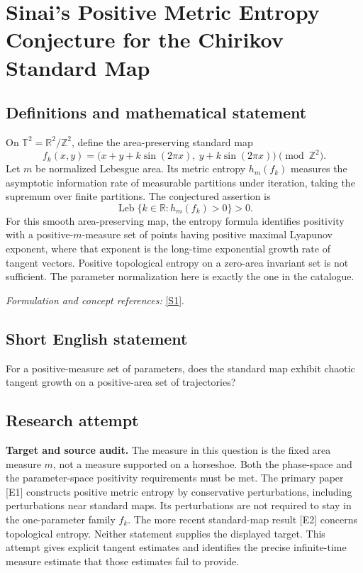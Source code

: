 \documentclass[11pt]{article}
\begin{document}
\section*{\texorpdfstring{Sinai's Positive Metric Entropy Conjecture for the Chirikov Standard Map}{Sinai's Positive Metric Entropy Conjecture for the Chirikov Standard Map}}\label{30006866}
\subsection{Definitions and mathematical statement}
On $\mathbb T^2={\mathbb{R}}^2/{\mathbb{Z}}^2$, define the area-preserving standard map
\[
 f_k(x,y)=\bigl(x+y+k\sin(2\pi x),\ y+k\sin(2\pi x)\bigr)\pmod{{\mathbb{Z}}^2}.
\]
Let $m$ be normalized Lebesgue area. Its metric entropy $h_m(f_k)$ measures the asymptotic information rate of measurable partitions under iteration, taking the supremum over finite partitions. The conjectured assertion is
\[
 \operatorname{Leb}\{k\in{\mathbb{R}}:h_m(f_k)>0\}>0.
\]
For this smooth area-preserving map, the entropy formula identifies positivity with a positive-$m$-measure set of points having positive maximal Lyapunov exponent, where that exponent is the long-time exponential growth rate of tangent vectors. Positive topological entropy on a zero-area invariant set is not sufficient. The parameter normalization here is exactly the one in the catalogue.
\par\smallskip\textit{Formulation and concept references:} \href{https://www.math.uci.edu/~asgor/Psim076.pdf}{[S1]}.

\subsection{Short English statement}
For a positive-measure set of parameters, does the standard map exhibit chaotic tangent growth on a positive-area set of trajectories?
\subsection{Research attempt}
\textbf{Target and source audit.}
The measure in this question is the fixed area measure $m$, not a measure
supported on a horseshoe.  Both the phase-space and the parameter-space
positivity requirements must be met.  The primary paper [E1] constructs
positive metric entropy by conservative perturbations, including perturbations
near standard maps.  Its perturbations are not required to stay in the
one-parameter family $f_k$.  The more recent standard-map result [E2] concerns
topological entropy.  Neither statement supplies the displayed target.  This
attempt gives explicit tangent estimates and identifies the precise infinite-time
measure estimate that those estimates fail to provide.
\end{document}
